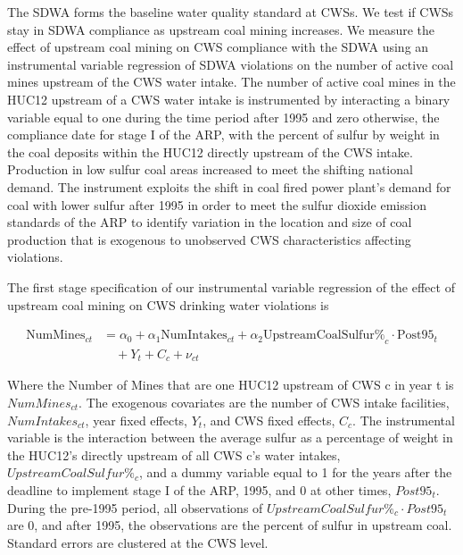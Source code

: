 \documentclass{article}
\begin{document}
The SDWA forms the baseline water quality standard at CWSs. We test if CWSs stay in SDWA compliance as upstream coal mining increases. We measure the effect of upstream coal mining on CWS compliance with the SDWA using an instrumental variable regression of SDWA violations on the number of active coal mines upstream of the CWS water intake. The number of active coal mines in the HUC12 upstream of a CWS water intake is instrumented by interacting a binary variable equal to one during the time period after 1995 and zero otherwise, the compliance date for stage I of the ARP, with the percent of sulfur by weight in the coal deposits within the HUC12 directly upstream of the CWS intake. Production in low sulfur coal areas increased to meet the shifting national demand. The instrument exploits the shift in coal fired power plant's demand for coal with lower sulfur after 1995 in order to meet the sulfur dioxide emission standards of the ARP to identify variation in the location and size of coal production that is exogenous to unobserved CWS characteristics affecting violations. 

The first stage specification of our instrumental variable regression of the effect of upstream coal mining on CWS drinking water violations is

\begin{equation}\label{1ststage2sls}
\begin{split}
\text{NumMines}_{ct} &= \alpha_0 + \alpha_1\text{NumIntakes}_{ct} + \alpha_2\text{UpstreamCoalSulfur\%}_c \cdot \text{Post95}_t \\
&\quad + Y_t + C_c + \nu_{ct}
\end{split}
\end{equation}

Where the Number of Mines that are one HUC12 upstream of CWS c in year t is $NumMines_{ct}$. The exogenous covariates are the number of CWS intake facilities, $NumIntakes_{ct}$, year fixed effects, $Y_t$, and CWS fixed effects, $C_c$. The instrumental variable is the interaction between the average sulfur as a percentage of weight in the HUC12's directly upstream of all CWS c's water intakes, $UpstreamCoalSulfur\%_c$, and a dummy variable equal to 1 for the years after the deadline to implement stage I of the ARP, 1995, and 0 at other times, $Post95_t$. During the pre-1995 period, all observations of $UpstreamCoalSulfur\%_c \cdot Post95_t$ are 0, and after 1995, the observations are the percent of sulfur in upstream coal. Standard errors are clustered at the CWS level. 
\end{document}
